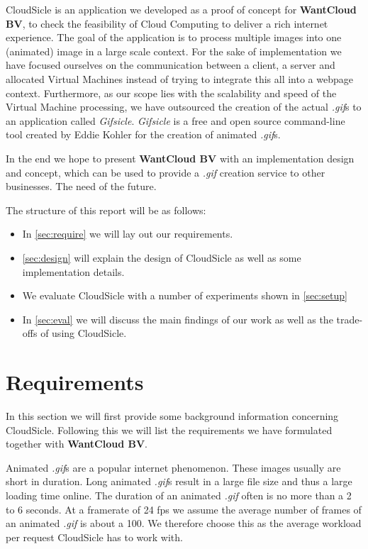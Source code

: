 \documentclass[twocolumn,twoside]{IEEEtran}
\begin{document}
CloudSicle is an application we developed as a proof of concept for \textbf{WantCloud BV}, to 
check the feasibility of Cloud Computing to deliver a rich internet experience.
The goal of the application is to process multiple images into one (animated) image in a large scale context. For the sake of implementation
we have focused ourselves on the communication between a client,
a server and allocated Virtual Machines instead of trying to integrate this all into a 
webpage context. Furthermore, as our scope lies with the scalability
and speed of the Virtual Machine processing, we have outsourced the
creation of the actual \textit{.gif}s to an application called \textit{Gifsicle}\cite{gifsicle}.
\textit{Gifsicle} is a free and open source command-line tool created
by Eddie Kohler for the creation of animated \textit{.gif}s.

In the end we hope to present \textbf{WantCloud BV} with an implementation
design and concept, which can be used to provide a \textit{.gif}
creation service to other businesses. The need of the future.

The structure of this report will be as follows:
\begin{samepage}
\begin{itemize}
\item In \autoref{sec:require} we will lay out our requirements.
\item \autoref{sec:design} will explain the design of CloudSicle as well as some implementation details.
\item We evaluate CloudSicle with a number of experiments shown in \autoref{sec:setup}
\item In \autoref{sec:eval} we will discuss the main findings of our work as well as the trade-offs of using CloudSicle.
\end{itemize}
\end{samepage}
\section{Requirements}
\label{sec:require}
In this section we will first provide some background information concerning CloudSicle. Following this we will list the requirements we have formulated  together with \textbf{WantCloud BV}.

Animated \textit{.gif}s are a popular internet phenomenon. These images usually are short in duration. Long animated \textit{.gif}s result in a large file size and thus a large loading time online. The duration of an animated \textit{.gif} often is no more than a 2 to 6 seconds. At a framerate of 24 fps we assume the average number of frames of an animated \textit{.gif} is about a 100. We therefore choose this as the average workload per request CloudSicle has to work with.
\end{document}
